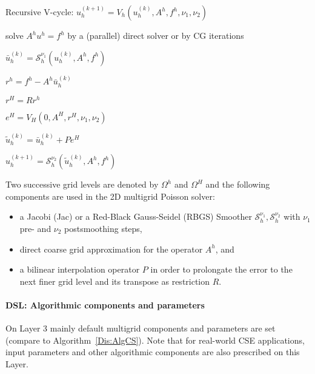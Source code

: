\documentclass[onecolumn]{svjour3}
\newlength{\algrhswidth}
\newcommand{\algrhs}[1]{\hfill \parbox[t]{\algrhswidth}{#1}}
\begin{document}
\begin{algorithm}
\caption[Multigrid correction scheme]{Recursive V-cycle: $u_h^{(k+1)} =
V_h(u^{(k)}_h,A^h,f^h,\nu_1,\nu_2)$}
\begin{algorithmic}[1]
 \STATE solve $A^h u^h = f^h$ by a (parallel) direct solver or by CG iterations

\ELSE

\STATE $\bar{u}^{(k)}_h =
\mathcal{S}^{\nu_1}_h(u_h^{(k)}, A^h,f^h)$
\algrhs{}

\STATE $r^h = f^h -
A^h \bar{u}^{(k)}_h$
\algrhs{}
\STATE $r^H = R r^h$
\algrhs{}

\STATE $e^H =
V_H(0,A^H,r^H,\nu_1,\nu_2)$
\algrhs{}

\STATE $\tilde{u}^{(k)}_h =
\bar{u}^{(k)}_h + P e^H$
\algrhs{}

\STATE $u^{(k+1)}_h =
\mathcal{S}^{\nu_2}_h(\tilde{u}_h^{(k)},
A^h,f^h)$ \algrhs{}
\ENDIF
\end{algorithmic} \label{Dis:AlgCS}

\end{algorithm}

Two successive grid levels are denoted by $\Omega^h$ and $\Omega^H$
and the following components are used in the 2D multigrid Poisson solver:
\begin{itemize}
\item a Jacobi (Jac) or a Red-Black Gauss-Seidel (RBGS) Smoother $\mathcal{S}^{\nu_1}_h,\mathcal{S}^{\nu_2}_h$ with
            $\nu_1$ pre- and $\nu_2$ postsmoothing steps, 
\item direct coarse grid approximation for the operator $A^h$, and 
\item a bilinear interpolation operator $P$ in order to prolongate the error to the next finer grid level and its transpose as restriction $R$.
\end{itemize}




\paragraph{DSL: Algorithmic components and parameters} On Layer 3 mainly default multigrid components and parameters are set (compare to Algorithm~\ref{Dis:AlgCS}). Note that for real-world CSE applications, input parameters and other algorithmic components are also prescribed on this Layer. 
\end{document}
